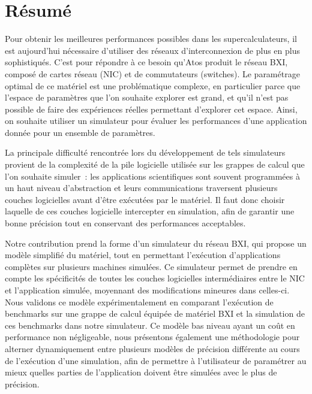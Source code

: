 
\chapter*{Résumé}

Pour obtenir les meilleures performances possibles dans les supercalculateurs,
il est aujourd'hui nécessaire d'utiliser des réseaux d'interconnexion de plus en
plus sophistiqués. C'est pour répondre à ce besoin qu'Atos produit le réseau
BXI, composé de cartes réseau (NIC) et de commutateurs (switches). Le
paramétrage optimal de ce matériel est une problématique complexe, en
particulier parce que l'espace de paramètres que l'on souhaite explorer est
grand, et qu'il n'est pas possible de faire des expériences réelles permettant
d'explorer cet espace. Ainsi, on souhaite utiliser un simulateur pour évaluer
les performances d'une application donnée pour un ensemble de paramètres. 

La principale difficulté rencontrée lors du développement de tels simulateurs
provient de la complexité de la pile logicielle utilisée sur les grappes de
calcul que l'on souhaite simuler~: les applications scientifiques sont souvent
programmées à un haut niveau d'abstraction et leurs communications traversent
plusieurs couches logicielles avant d'être exécutées par le matériel. Il faut
donc choisir laquelle de ces couches logicielle intercepter en simulation, afin
de garantir une bonne précision tout en conservant des performances acceptables. 

Notre contribution prend la forme d'un simulateur du réseau BXI, qui propose un
modèle simplifié du matériel, tout en permettant l'exécution d'applications
complètes sur plusieurs machines simulées. Ce simulateur permet de prendre en
compte les spécificités de toutes les couches logicielles intermédiaires entre
le NIC et l'application simulée, moyennant des modifications mineures dans
celles-ci. Nous validons ce modèle expérimentalement en comparant l'exécution de
benchmarks sur une grappe de calcul équipée de matériel BXI et la simulation de
ces benchmarks dans notre simulateur. Ce modèle bas niveau ayant un coût en
performance non négligeable, nous présentons également une méthodologie pour
alterner dynamiquement entre plusieurs modèles de précision différente au cours
de l'exécution d'une simulation, afin de permettre à l'utilisateur de paramétrer
au mieux quelles parties de l'application doivent être simulées avec le plus de
précision.

